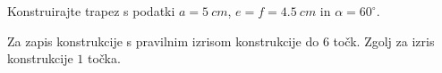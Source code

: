 \documentclass[addpoints]{exam}
\begin{document}
\begin{questions}
    \newpage

    \question[6]
    Konstruirajte trapez s podatki $a=5~cm$, $e=f=4.5~cm$ in $\alpha=60^\circ$.

    \begin{solution}[18cm]
        Za zapis konstrukcije s pravilnim izrisom konstrukcije do $6$ točk. Zgolj za izris konstrukcije $1$ točka.
    \end{solution}

















\end{questions}
\end{document}
